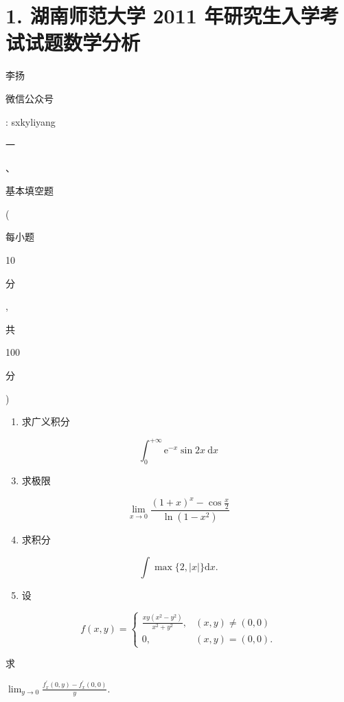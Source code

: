 \documentclass[10pt]{article}
\begin{document}
\section{1. 湖南师范大学 2011 年研究生入学考试试题数学分析}
\begin{CJK}{UTF8}{mj}李扬\end{CJK}

\begin{CJK}{UTF8}{mj}微信公众号\end{CJK}: sxkyliyang

\begin{CJK}{UTF8}{mj}一\end{CJK}、\begin{CJK}{UTF8}{mj}基本填空题\end{CJK}(\begin{CJK}{UTF8}{mj}每小题\end{CJK} 10 \begin{CJK}{UTF8}{mj}分\end{CJK}, \begin{CJK}{UTF8}{mj}共\end{CJK} 100 \begin{CJK}{UTF8}{mj}分\end{CJK})

\begin{enumerate}
  \item \begin{CJK}{UTF8}{mj}求广义积分\end{CJK}
\end{enumerate}
$$
\int_{0}^{+\infty} \mathrm{e}^{-x} \sin 2 x \mathrm{~d} x
$$

\begin{enumerate}
  \setcounter{enumi}{2}
  \item \begin{CJK}{UTF8}{mj}求极限\end{CJK}
\end{enumerate}
$$
\lim _{x \rightarrow 0} \frac{(1+x)^{x}-\cos \frac{x}{2}}{\ln \left(1-x^{2}\right)}
$$

\begin{enumerate}
  \setcounter{enumi}{3}
  \item \begin{CJK}{UTF8}{mj}求积分\end{CJK}
\end{enumerate}
$$
\int \max \{2,|x|\} \mathrm{d} x .
$$

\begin{enumerate}
  \setcounter{enumi}{4}
  \item \begin{CJK}{UTF8}{mj}设\end{CJK}
\end{enumerate}
$$
f(x, y)= \begin{cases}\frac{x y\left(x^{2}-y^{2}\right)}{x^{2}+y^{2}}, & (x, y) \neq(0,0) \\ 0, & (x, y)=(0,0) .\end{cases}
$$
\begin{CJK}{UTF8}{mj}求\end{CJK} $\lim _{y \rightarrow 0} \frac{f_{x}^{\prime}(0, y)-f_{x}^{\prime}(0,0)}{y}$.
\end{document}
